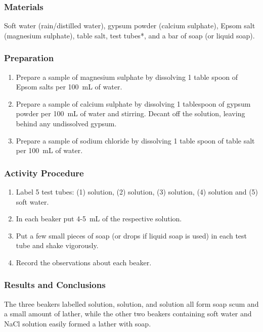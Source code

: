 \subsubsection*{Materials}
Soft water (rain/distilled water), gypsum powder (calcium sulphate), Epsom salt (magnesium sulphate), table salt, test tubes*, and a bar of soap (or liquid soap).

\subsubsection*{Preparation}
\begin{enumerate}
\item {Prepare a sample of magnesium sulphate by dissolving 1 table spoon of Epsom salts per 100~mL of water.}
\item {Prepare a sample of calcium sulphate by dissolving 1 tablespoon of gypsum powder per 100~mL of water and stirring. Decant off the solution, leaving behind any undissolved gypsum}.
\item {Prepare a sample of sodium chloride by dissolving 1 table spoon of table salt per 100~mL of water.}

\end{enumerate}

\subsubsection*{Activity Procedure}
\begin{enumerate}
\item{Label 5 test tubes: (1)  solution, (2)  solution, (3)  solution, (4)  solution and (5) soft water.}
\item{In each beaker put 4-5~mL of the respective solution.}
\item{Put a few small pieces of soap (or drops if liquid soap is used) in each test tube and shake vigorously.}
\item{Record the observations about each beaker.}
\end{enumerate}

\subsubsection*{Results and Conclusions}
The three beakers labelled  solution,  solution, and  solution all form soap scum and a small amount of lather, while the other two beakers containing soft water and NaCl solution easily formed a lather with soap.

